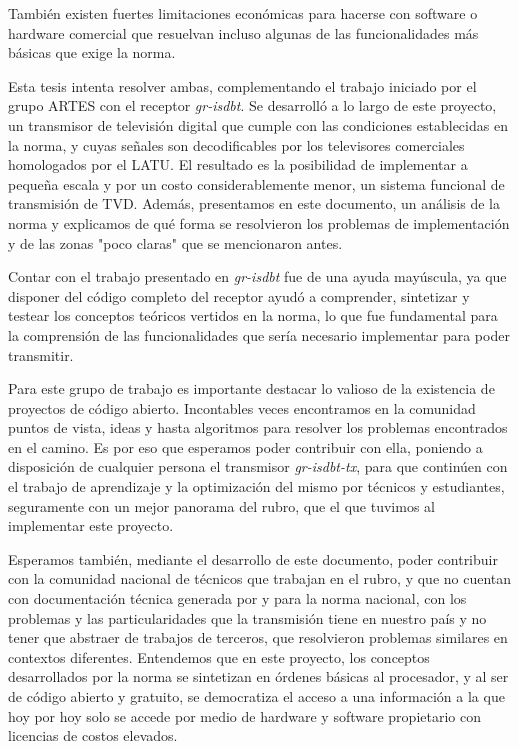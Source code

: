 También existen fuertes limitaciones económicas para hacerse con software o hardware comercial que resuelvan incluso algunas de las funcionalidades más básicas que exige la norma. 

Esta tesis intenta resolver ambas, complementando el trabajo iniciado por el grupo ARTES con el receptor \textit{gr-isdbt}. Se desarrolló a lo largo de este proyecto, un transmisor de televisión digital que cumple con las condiciones establecidas en la norma, y cuyas señales son decodificables por los televisores comerciales homologados por el LATU. El resultado es la posibilidad de implementar a pequeña escala y por un costo considerablemente menor, un sistema funcional de transmisión de TVD. Además, presentamos en este documento, un análisis de la norma y explicamos de qué forma se resolvieron los problemas de implementación y de las zonas "poco claras" que se mencionaron antes.

Contar con el trabajo presentado en \textit{gr-isdbt} fue de una ayuda mayúscula, ya que disponer del código completo del receptor ayudó a comprender, sintetizar y testear los conceptos teóricos vertidos en la norma, lo que fue fundamental para la comprensión de las funcionalidades que sería necesario implementar para poder transmitir. 

Para este grupo de trabajo es importante destacar lo valioso de la existencia de proyectos de código abierto. Incontables veces encontramos en la comunidad puntos de vista, ideas y hasta algoritmos para resolver los problemas encontrados en el camino. Es por eso que esperamos poder contribuir con ella, poniendo a disposición de cualquier persona el transmisor \textit{gr-isdbt-tx}, para que continúen con el trabajo de aprendizaje y la optimización del mismo por técnicos y estudiantes, seguramente con un mejor panorama del rubro, que el que tuvimos al implementar este proyecto.

Esperamos también, mediante el desarrollo de este documento, poder contribuir con la comunidad nacional de técnicos que trabajan en el rubro, y que no cuentan con documentación técnica generada por y para la norma nacional, con los problemas y las particularidades que la transmisión tiene en nuestro país y no tener que abstraer de trabajos de terceros, que resolvieron problemas similares en contextos diferentes. Entendemos que en este proyecto, los conceptos desarrollados por la norma se sintetizan en órdenes básicas al procesador, y al ser de código abierto y gratuito, se democratiza el acceso a una información a la que hoy por hoy solo se accede por medio de hardware y software propietario con licencias de costos elevados.

